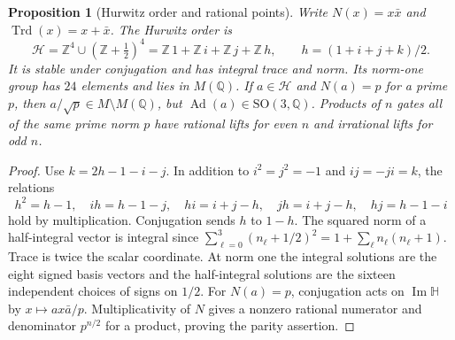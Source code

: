 \documentclass[11pt,reqno]{amsart}
\newtheorem{proposition}[theorem]{Proposition}
\theoremstyle{definition}
\theoremstyle{remark}
\numberwithin{equation}{section}
\newcommand{\HH}{\mathbb{H}}
\newcommand{\Q}{\mathbb{Q}}
\newcommand{\Z}{\mathbb{Z}}
\newcommand{\Ad}{\operatorname{Ad}}
\newcommand{\im}{\operatorname{Im}}
\newcommand{\SO}{\mathrm{SO}}
\begin{document}
\begin{proposition}[Hurwitz order and rational points]\label{m6:hurwitz}
Write \(N(x)=x\bar x\) and \(\operatorname{Trd}(x)=x+\bar x\).
The Hurwitz order is
\[
 \mathcal H=\Z^4\cup(\Z+\tfrac12)^4
 =\Z\,1+\Z\,i+\Z\,j+\Z\,h,\qquad h=(1+i+j+k)/2.
\]
It is stable under conjugation and has integral trace and norm.
Its norm-one group has \(24\) elements and lies in \(M(\Q)\).
If \(a\in\mathcal H\) and \(N(a)=p\) for a prime \(p\), then
\(a/\sqrt p\in M\setminus M(\Q)\), but \(\Ad(a)\in\SO(3,\Q)\).
Products of \(n\) gates all of the same prime norm \(p\) have
rational lifts for even \(n\) and irrational lifts for odd \(n\).
\end{proposition}
\begin{proof}
Use \(k=2h-1-i-j\). In addition to \(i^2=j^2=-1\) and \(ij=-ji=k\),
the relations
\[
 h^2=h-1,\quad ih=h-1-j,\quad hi=i+j-h,\quad
 jh=i+j-h,\quad hj=h-1-i
\]
hold by multiplication. Conjugation sends \(h\) to \(1-h\).
The squared norm of a half-integral vector is integral since
\(\sum_{\ell=0}^3 (n_\ell+1/2)^2=1+\sum_\ell n_\ell(n_\ell+1)\).
Trace is twice the scalar coordinate. At norm one the integral
solutions are the eight signed basis vectors and the half-integral
solutions are the sixteen independent choices of signs on \(1/2\).
For \(N(a)=p\), conjugation acts on \(\im\HH\) by \(x\mapsto ax\bar a/p\).
Multiplicativity of \(N\) gives a nonzero rational numerator and
denominator \(p^{n/2}\) for a product, proving the parity assertion.
\end{proof}
\end{document}
